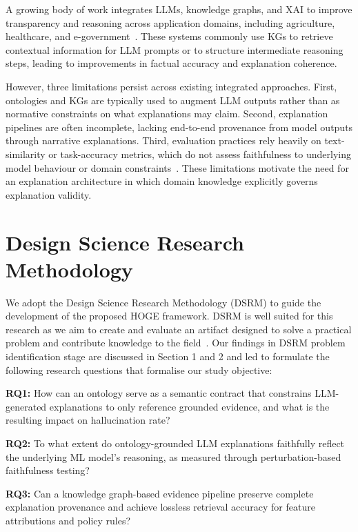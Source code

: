 \documentclass[lnbip]{svmultln}
\begin{document}
A growing body of work integrates LLMs, knowledge graphs, and XAI to improve transparency and reasoning across application domains, including agriculture, healthcare, and e-government~\cite{seeds2025,soil2025,agri2025,medkgcot2025,depress2025,cognet2025,egov2025,hybridkg2025,compass2025}. These systems commonly use KGs to retrieve contextual information for LLM prompts or to structure intermediate reasoning steps, leading to improvements in factual accuracy and explanation coherence.

However, three limitations persist across existing integrated approaches. First, ontologies and KGs are typically used to augment LLM outputs rather than as normative constraints on what explanations may claim. Second, explanation pipelines are often incomplete, lacking end-to-end provenance from model outputs through narrative explanations. Third, evaluation practices rely heavily on text-similarity or task-accuracy metrics, which do not assess faithfulness to underlying model behaviour or domain constraints~\cite{gdm2026,medsum2026,medkgcot2025}. These limitations motivate the need for an explanation architecture in which domain knowledge explicitly governs explanation validity.


\section{Design Science Research Methodology}
We adopt the Design Science Research Methodology (DSRM) to guide the development of the proposed HOGE framework. DSRM is well suited for this research as we aim to create and evaluate an artifact designed to solve a practical problem and contribute knowledge to the field~\cite{peffers2007, hevner2004}.
Our findings in DSRM problem identification stage are discussed in Section 1 and 2 and led to formulate the following research questions that formalise our study objective:

\noindent\textbf{RQ1:} How can an ontology serve as a semantic contract that constrains LLM-generated explanations to only reference grounded evidence, and what is the resulting impact on hallucination rate?

\noindent\textbf{RQ2:} To what extent do ontology-grounded LLM explanations faithfully reflect the underlying ML model's reasoning, as measured through perturbation-based faithfulness testing?

\noindent\textbf{RQ3:} Can a knowledge graph-based evidence pipeline preserve complete explanation provenance and achieve lossless retrieval accuracy for feature attributions and policy rules?
\end{document}
